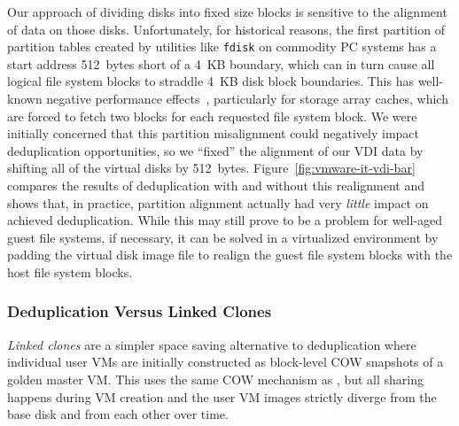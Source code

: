 Our approach of dividing disks into fixed size blocks is sensitive to
the alignment of data on those disks.  Unfortunately, for historical
reasons, the first partition of partition tables created by utilities
like {{\tt \small fdisk}} on commodity PC systems has a start address
512~bytes short of a 4~KB boundary, which can in turn cause all
logical file system blocks to straddle 4~KB disk block boundaries.
This has well-known negative performance effects~\cite{vmware-align},
particularly for storage array caches, which are forced to fetch two
blocks for each requested file system block.  We were initially
concerned that this partition misalignment could negatively impact
deduplication opportunities, so we ``fixed'' the alignment of our VDI
data by shifting all of the virtual disks by 512~bytes.
Figure~\ref{fig:vmware-it-vdi-bar} compares the results of
deduplication with and without this realignment and shows that, in
practice, partition alignment actually had very \emph{little} impact
on achieved deduplication.   While this may still prove to be a problem for
well-aged guest file systems, if necessary, it can be solved in a
virtualized environment by padding the virtual disk image file to
realign the guest file system blocks with the host file system blocks.


\subsubsection{Deduplication Versus Linked Clones}
\label{sec:vmware-vdi-linked-clones}

\emph{Linked clones} are a simpler space saving alternative to
deduplication where individual user VMs are initially constructed as
block-level COW snapshots of a golden master VM.  This uses the same COW
mechanism as \DeDe, but all sharing happens during VM creation and the
user VM images strictly diverge from the base disk and from each other
over time.

